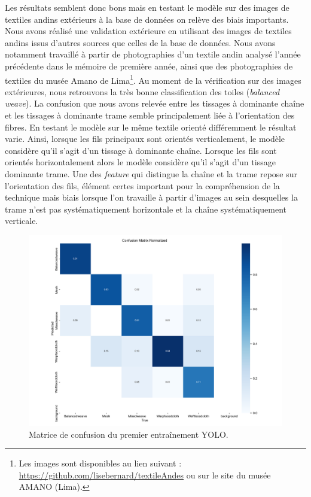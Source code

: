 Les résultats semblent donc bons mais en testant le modèle sur des images de textiles andins extérieurs à la base de données on relève des biais importants. Nous avons réalisé une validation extérieure en utilisant des images de textiles andins issus d'autres sources que celles de la base de données. Nous avons notamment travaillé à partir de photographies d'un textile andin analysé l'année précédente dans le mémoire de première année, ainsi que des photographies de textiles du musée Amano de Lima\footnote{Les images sont disponibles au lien suivant : \url{https://github.com/lisebernard/textileAndes} ou sur le site du musée AMANO (Lima).}. Au moment de la vérification sur des images extérieures, nous retrouvons la très bonne classification des toiles (\textit{balanced weave}). La confusion que nous avons relevée entre les tissages à dominante chaîne et les tissages à dominante trame semble principalement liée à l'orientation des fibres. En testant le modèle sur le même textile orienté différemment le résultat varie. Ainsi, lorsque les fils principaux sont orientés verticalement, le modèle considère qu'il s'agit d'un tissage à dominante chaîne. Lorsque les fils sont orientés horizontalement alors le modèle considère qu'il s'agit d'un tissage dominante trame. Une des \textit{feature} qui distingue la chaîne et la trame repose sur l'orientation des fils, élément certes important pour la compréhension de la technique mais biais lorsque l'on travaille à partir d'images au sein desquelles la trame n'est pas systématiquement horizontale et la chaîne systématiquement verticale. 

\begin{figure}[!h]
	\begin{center}
		\includegraphics[width=16cm]{../images/YOLO_50epoch_confusion_matrix_normalized.png}
		\caption{Matrice de confusion du premier entraînement YOLO.}
	 \end{center}
\end{figure}

